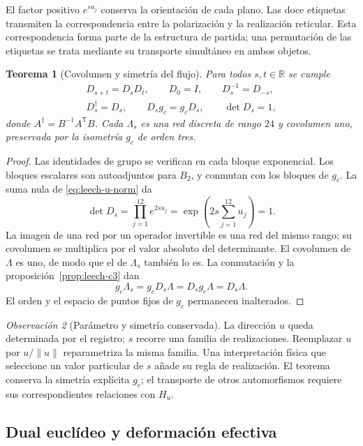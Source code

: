\documentclass[a4paper,10pt]{article}
\newtheorem{theorem}{Teorema}[section]
\theoremstyle{definition}\newtheorem{definition}[theorem]{Definición}
\theoremstyle{remark}\newtheorem{remark}[theorem]{Observación}
\numberwithin{equation}{section}
\begin{document}
El factor positivo \(e^{su_j}\) conserva la orientación de cada
plano. Las doce etiquetas transmiten la correspondencia entre la
polarización y la realización reticular. Esta correspondencia
forma parte de la estructura de partida; una permutación de las
etiquetas se trata mediante su transporte simultáneo en ambos objetos.

\begin{theorem}[Covolumen y simetría del flujo]
\label{thm:leech-flow}
Para todos \(s,t\in\mathbb R\) se cumple
\[
\begin{gathered}
 D_{s+t}=D_sD_t,\qquad D_0=I,\qquad D_s^{-1}=D_{-s},\\
 D_s^\dagger=D_s,\qquad D_sg_c=g_cD_s,\qquad \det D_s=1,
\end{gathered}
\]
donde \(A^\dagger=B^{-1}A^{\mathsf T}B\).
Cada \(\Lambda_s\) es una red discreta de rango \(24\) y covolumen
uno, preservada por la isometría \(g_c\) de orden tres.
\end{theorem}
\begin{proof}
Las identidades de grupo se verifican en cada bloque exponencial.
Los bloques escalares son autoadjuntos para \(B_2\), y conmutan
con los bloques de \(g_c\). La suma nula de
\eqref{eq:leech-u-norm} da
\[
 \det D_s=\prod_{j=1}^{12}e^{2su_j}
 =\exp\left(2s\sum_{j=1}^{12}u_j\right)=1.
\]
La imagen de una red por un operador invertible es una red del
mismo rango; su covolumen se multiplica por el valor absoluto del
determinante. El covolumen de \(\Lambda\) es uno, de modo que el
de \(\Lambda_s\) también lo es. La conmutación y
la proposición~\ref{prop:leech-c3} dan
\[
 g_c\Lambda_s=g_cD_s\Lambda=D_sg_c\Lambda=D_s\Lambda.
\]
El orden y el espacio de puntos fijos de \(g_c\) permanecen
inalterados.
\end{proof}

\begin{remark}[Parámetro y simetría conservada]
La dirección \(u\) queda determinada por el registro; \(s\) recorre
una familia de realizaciones. Reemplazar \(u\) por \(u/\|u\|\)
reparametriza la misma familia. Una interpretación física que
seleccione un valor particular de \(s\) añade su regla de realización.
El teorema conserva la simetría explícita \(g_c\); el transporte de
otros automorfismos requiere sus correspondientes relaciones con
\(H_u\).
\end{remark}

\subsection{Dual euclídeo y deformación efectiva}
\label{subsec:leech-dual}
\end{document}
